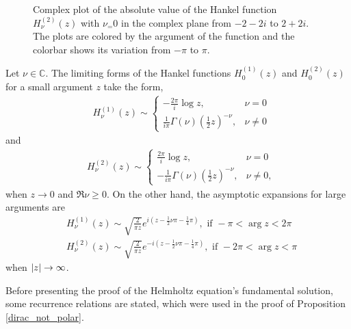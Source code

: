 \begin{figure}[H]
\begin{minipage}{.5\textwidth}
        \captionsetup{width=0.9\linewidth} %
        \caption{Complex plot of the absolute value of the Hankel function \(H_\nu^{(2)}(z)\) with \(\nu_=0\) in the complex plane from \(-2-2i\) to \(2+2i\). The plots are colored by the argument of the function and the colorbar shows its variation from \(-\pi\) to \(\pi\).}
        \label{hankel_function_2_complex_plot}
    \end{minipage}
\end{figure}

\begin{proposition}\label{asympt_hankel_app_c}
    Let \(\nu \in \mathbb{C}\). The limiting forms of the Hankel functions \(H_0^{(1)}(z)\) and \(H_0^{(2)}(z)\) for a small argument \(z\) take the form,
    \begin{align*}
        &H_\nu^{(1)}(z) \sim
        \begin{cases}
            -\frac{2 \pi}{i} \log z, & \nu = 0\\
            \frac{1}{i \pi} \Gamma(\nu) \left(\frac{1}{2}z\right)^{-\nu}, & \nu \neq 0
        \end{cases}
    \end{align*}
    and
    \begin{align*}
        &H_\nu^{(2)}(z) \sim 
        \begin{cases}
            \frac{2 \pi}{i} \log z, & \nu = 0\\
            -\frac{1}{i \pi} \Gamma(\nu) \left(\frac{1}{2}z\right)^{-\nu}, & \nu \neq 0,
        \end{cases}
    \end{align*}
    when \(z \rightarrow 0\) and \(\Re{\nu} \geq 0\). On the other hand, the asymptotic expansions for large arguments are 
    \begin{align*}
        &H_\nu^{(1)}(z) \sim \sqrt{\frac{2}{\pi z}}e^{i\left(z-\frac{1}{2}\nu \pi - \frac{1}{4}\pi\right)}, \text{ if } -\pi < \arg z < 2 \pi\\
        &H_\nu^{(2)}(z) \sim \sqrt{\frac{2}{\pi z}}e^{-i\left(z-\frac{1}{2}\nu \pi - \frac{1}{4}\pi\right)}, \text{ if } -2\pi < \arg z < \pi
    \end{align*}
    when \(\abs{z} \rightarrow \infty\).
\end{proposition}

Before presenting the proof of the Helmholtz equation's fundamental solution, some recurrence relations are stated, which were used in the proof of Proposition \ref{dirac_not_polar}.

